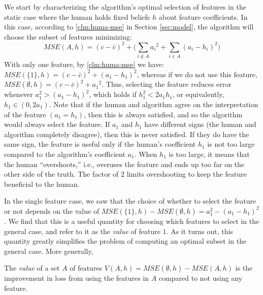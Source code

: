 

We start by characterizing the algorithm's optimal selection of features in the static case where the human holds fixed beliefs $h$ about feature coefficients. %
In this case, according to \cref{clm:huma-mse} in Section \ref{sec:model}, the algorithm will choose the subset of features minimizing:
$$
MSE(A,h) = (c-\bar c)^2 + \big(\sum_{i \notin A} {a_i}^2 + \sum_{i \in A} (a_i - h_{i})^2 \big)
$$
With only one feature, by \cref{clm:huma-mse} we have:
$MSE(\{1\},h) = (c-\bar c)^2 + (a_1 - h_{1})^2$, 
whereas if we do not use this feature, 
$MSE(\emptyset,h) = (c-\bar c)^2 + {a_1}^2$. 
Thus, selecting the feature reduces error whenever
$a_1^2 > (a_1 - h_1)^2$, which holds if $h_1^2 < 2a_1 h_1$, { or equivalently, $h_1 \in (0,2a_1)$}.  
Note that if the human and algorithm agree on the interpretation of the feature $(a_1 = h_1)$, then this is always satisfied, and so the algorithm would always select the feature. If $a_1$ and $h_1$ have different signs (the human and algorithm completely disagree), then this is never satisfied. 
If they do have the same sign, the feature is useful only if the human's coefficient \( h_1 \) is not too large compared to the algorithm's coefficient \( a_1 \).
When $h_1$ is too large, it means that the human ``overshoots,'' i.e., overuses the feature and ends up too far on the other side of the truth. %
The factor of $2$ limits overshooting to keep the feature beneficial to the human.


In the single feature case, we saw that the choice of whether to select the feature or not depends on the value of $MSE(\{1\},h) - MSE(\emptyset,h) = a_1^2-(a_1-h_1)^2$. We find that this is a useful quantity for choosing which features to select in the general case, and refer to it as the {\em value} of feature $1$. As it turns out, this quantity greatly simplifies the problem of computing an optimal subset in the general case. 
More generally, 

\begin{definition} \label{dfn:value-static}
The {\em value} of a set $A$ of features $V(A,h) = MSE(\emptyset,h) - MSE(A,h)$ is the improvement in loss from using the features in $A$ compared to not using any feature. 
\end{definition}




